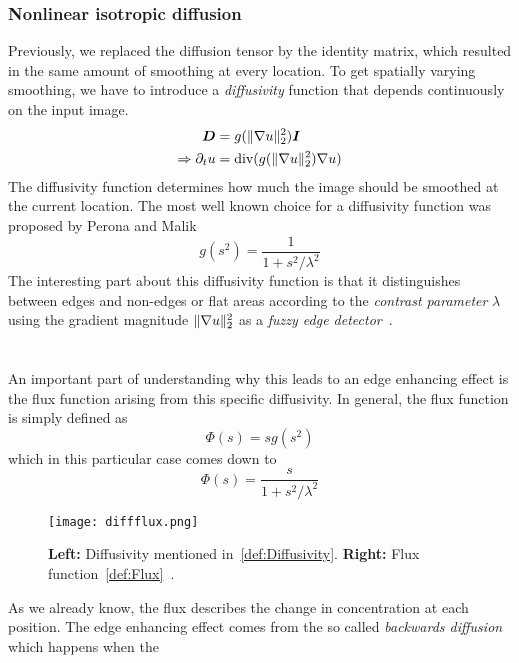 \subsubsection*{Nonlinear isotropic diffusion}\label{sub:NonIsoDiff}
Previously, we replaced the diffusion tensor by the identity matrix, which resulted in the same
amount of smoothing at every location.
To get spatially varying smoothing, we have to introduce a \textit{diffusivity} function that
depends continuously on the input image. 
\begin{align}
    \boldsymbol D &= g(\lVert\mathbf{\nabla} u\rVert_2^2)\boldsymbol I\\
    \Rightarrow \partial_t u & = \textnormal{div}(g(\lVert\mathbf{\nabla}
    u\rVert_2^2)\mathbf{\nabla} u)\label{eq:NonIsoDiff}
\end{align}
The diffusivity function determines how much the image should be smoothed at the current location.
The most well known choice for a diffusivity function was proposed by Perona and Malik 
~\cite{perona-malik}
\begin{equation}
    g(s^2) = \frac{1}{1 + s^2/\lambda^2}\label{def:Diffusivity}
\end{equation}
The interesting part about this diffusivity function is that it distinguishes between edges and
non-edges or flat areas according to the \textit{contrast parameter} $\lambda$ using the gradient
magnitude $\lVert\mathbf{\nabla} u\rVert_2^2$ as a \textit{fuzzy edge detector}~\cite{dic}. \\
\\ \\ 
\noindent An important part of understanding why this leads to an edge enhancing effect is the flux function
arising from this specific diffusivity. In general, the flux function is simply defined as 
\begin{equation}
    \Phi(s) = sg(s^2)
\end{equation}
which in this particular case comes down to
\begin{equation}
    \Phi(s) =\frac{s}{1 + s^2/\lambda^2}\label{def:Flux}
\end{equation}
\begin{figure}
    \texttt{[image: diffflux.png]}
    \caption{\textbf{Left:} Diffusivity mentioned in~\eqref{def:Diffusivity}. \textbf{Right:} Flux
    function~\eqref{def:Flux}~\cite{dic}.}\label{fig:DiffFlux}
\end{figure}
As we already know, the flux describes the change in concentration at each position. The edge
enhancing effect comes from the so called \textit{backwards diffusion} which happens when the
